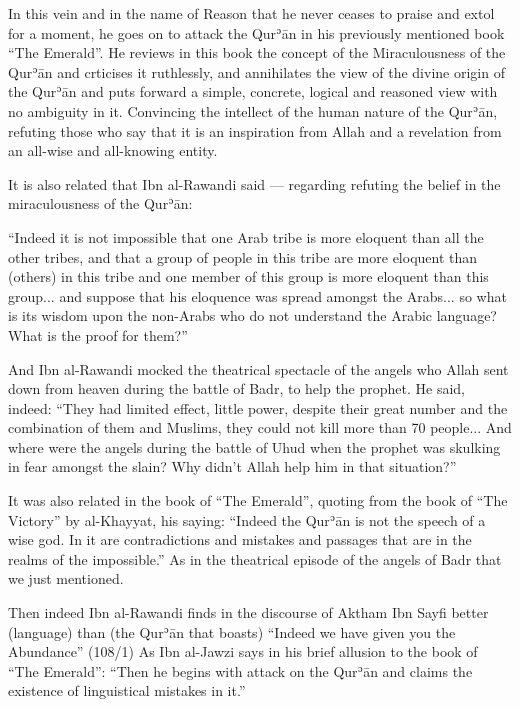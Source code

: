 \documentclass[12pt]{memoir}
\def\´{ʾ} %
\def \Quran{Qur\-\´ān} %
\let \Qrn=\Quran      %
\def\–{-\hskip0pt}
\begin{document}
In this vein and in the name of Reason that he never ceases to praise and extol
for a moment, he goes on to attack the \Qrn{} in his previously mentioned book
“The Emerald”. He reviews in this book the concept of the Miraculousness of the
\Qrn{} and crticises it ruthlessly, and annihilates the view of the divine
origin of the \Qrn{} and puts forward a simple, concrete, logical and reasoned
view with no ambiguity in it. Convincing the intellect of the human nature of
the \Quran, refuting those who say that it is an inspiration from Allah and a
revelation from an all-wise and all\–knowing entity.

It is also related that Ibn al\–Rawandi said — regarding refuting the belief in
the miraculousness of the \Quran:

“Indeed it is not impossible that one Arab tribe is more eloquent than all the
other tribes, and that a group of people in this tribe are more eloquent than
(others) in this tribe and one member of this group is more eloquent than this
group... and suppose that his eloquence was spread amongst the Arabs... so what
is its wisdom upon the non-Arabs who do not understand the Arabic language?
What is the proof for them?”\footnotemark


And Ibn al\–Rawandi mocked the theatrical spectacle of the angels
who Allah sent down from heaven during the battle of Badr,
to help the prophet.
He said, indeed:
“They had limited effect, little power, despite their great number and
the combination of them and Muslims,
they could not kill more than 70 people...
And where were the angels during the battle of Uhud when the prophet was
skulking in fear amongst the slain?
Why didn’t Allah help him in that situation?”\footnotemark


It was also related in the book of “The Emerald”, quoting from the book of
“The Victory” by al\–Khayyat, his saying: “Indeed the \Qrn{} is not the speech
of a wise god. In it are contradictions and mistakes and passages that are in
the realms of the impossible.”\footnotemark\@
As in the theatrical episode of the angels of Badr that we just mentioned.


Then indeed Ibn al\–Rawandi finds in the discourse of Aktham Ibn Sayfi better
(language) than (the \Qrn{} that boasts) “Indeed we have given you the
Abundance” (108/1)\footnotemark\@
{}
As Ibn al\–Jawzi says in his brief allusion to the book of “The Emerald”: “Then
he begins with attack on the \Qrn{} and claims the existence of linguistical
mistakes in it.”\footnotemark
\end{document}
